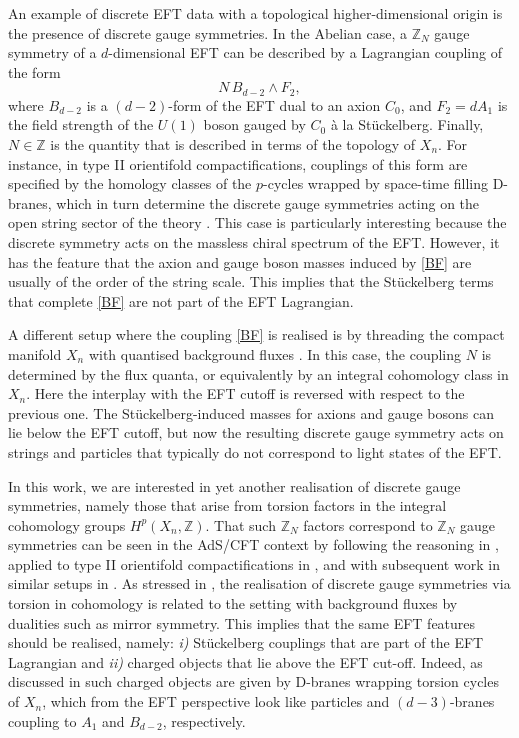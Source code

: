 \documentclass[11pt]{article}
\def\be{\begin{equation}}
\def\ee{\end{equation}}
\newcommand{\IZ}{\mathbb{Z}}
\begin{document}
An example of discrete EFT data with a topological higher-dimensional origin is the presence of discrete gauge symmetries. In the Abelian case, a $\IZ_N$ gauge symmetry of a $d$-dimensional EFT can be described by a Lagrangian coupling of the form \cite{Banks:2010zn}
\be
N  \, B_{d-2} \wedge F_2 ,
\label{BF}
\ee
where $B_{d-2}$ is a $(d-2)$-form of the EFT  dual to an axion $C_0$, and $F_2=dA_1$ is the field strength of the $U(1)$ boson gauged by $C_0$  \`a la St\"uckelberg. Finally, $N \in \IZ$ is the quantity that is described in terms of the topology of $X_n$. For instance, in type II orientifold compactifications, couplings of this form are specified by the homology classes of the $p$-cycles wrapped by space-time filling D-branes, which in turn determine the discrete gauge symmetries acting on the open string sector of the theory \cite{Berasaluce-Gonzalez:2011gos}. This case is particularly interesting because the discrete symmetry acts on the massless chiral spectrum of the EFT. However, it has the feature that the axion and gauge boson masses induced by \eqref{BF} are usually of the order of the string scale. This implies that the St\"uckelberg terms that complete  \eqref{BF} are not part of the EFT Lagrangian. 

A different setup where the coupling \eqref{BF} is realised is by threading the compact manifold $X_n$ with quantised background fluxes \cite{Berasaluce-Gonzalez:2012awn}. In this case, the coupling $N$ is determined by the flux quanta, or equivalently by an integral cohomology class in $X_n$. Here the interplay with the EFT cutoff is reversed with respect to the previous one. The St\"uckelberg-induced masses for axions and gauge bosons can lie below the EFT cutoff, but now the resulting discrete gauge symmetry acts on strings and particles that typically do not correspond to light states of the EFT. 

In this work, we are interested in yet another realisation of discrete gauge symmetries, namely those that arise from torsion factors in the integral cohomology groups $H^p(X_n, \IZ)$. That such $\IZ_N$ factors correspond to $\IZ_N$ gauge symmetries can be seen in the AdS/CFT context by following the reasoning in \cite{Gukov:1998kn,Witten:1998wy},  applied to type II orientifold compactifications in \cite{Camara:2011jg}, and with subsequent work in similar setups in \cite{Grimm:2011tb,Berasaluce-Gonzalez:2012abm,Berasaluce-Gonzalez:2012awn,Mayrhofer:2014laa,Grimm:2015ona,Braun:2017oak}. As stressed in \cite{Berasaluce-Gonzalez:2012awn}, the realisation of discrete gauge symmetries via torsion in cohomology is related to the setting with background fluxes by dualities such as mirror symmetry. This implies that the same EFT features should be realised, namely: {\it i)} St\"uckelberg couplings that are part of the EFT Lagrangian and {\it ii)}  charged objects that lie above the EFT cut-off. Indeed, as discussed in \cite{Camara:2011jg} such charged objects are given by D-branes wrapping torsion cycles of $X_n$, which from the EFT perspective look like particles and $(d-3)$-branes coupling to $A_1$ and $B_{d-2}$, respectively. 
\end{document}
